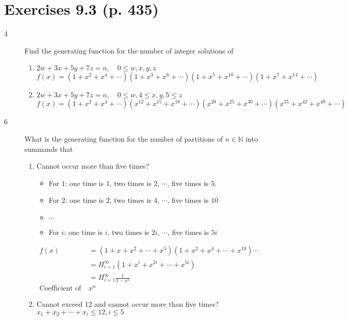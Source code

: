 \documentclass[a4paper]{article}
\begin{document}
\section*{Exercises 9.3 (p. 435)  }
\begin{description}
\item[4] Find the generating function for the number of integer solutions of
\begin{enumerate}[label=\alph*)]
    \item $2w+3x+5y+7z=n,\quad 0\leq w,x,y,z$\\
    $f(x)=(1+x^2+x^4+\cdots)(1+x^3+x^6+\cdots)(1+x^5+x^{10}+\cdots)(1+x^7+x^{14}+\cdots)$
    \item $2w+3x+5y+7z=n,\quad 0\leq w, 4\leq x,y, 5\leq z$\\
    $f(x)=(1+x^2+x^4+\cdots)(x^{12}+x^{15}+x^{18}+\cdots)(x^{20}+x^{25}+x^{30}+\cdots)(x^{35}+x^{42}+x^{49}+\cdots)$
\end{enumerate}
\item[6] What is the generating function for the number of partitions of $n\in\mathbb{N}$ into summands that
\begin{enumerate}[label=(\alph*)]
    \item Cannot occur more than five times?
    \begin{itemize}
        \item For $1$: one time is $1$, two times is $2$, $\cdots$, five times is $5$.
        \item For $2$: one time is $2$, two times is $4$, $\cdots$, five times is $10$
        \item $\cdots$
        \item For $i$: one time is $i$, two times is $2i$, $\cdots$, five times is $5i$
    \end{itemize}
    \begin{align*}
    f(x)&=(1+x+x^2+\cdots +x^5)(1+x^2+x^4+\cdots +x^{10})\cdots\\
    &=\Pi_{i=1}^{\infty}{(1+x^i+x^{2i}+\cdots+x^{5i})}\\
    &=\Pi_{i=1}^{\infty}{\frac{1}{1-x^2}}\\
    \text{Coefficient of }&x^n
    \end{align*}
    \item Cannot exceed 12 and cannot occur more than five times?
    $x_1+x_2+\cdots+x_i\leq 12,i\leq 5$
\end{enumerate}
\end{description}
\end{document}
